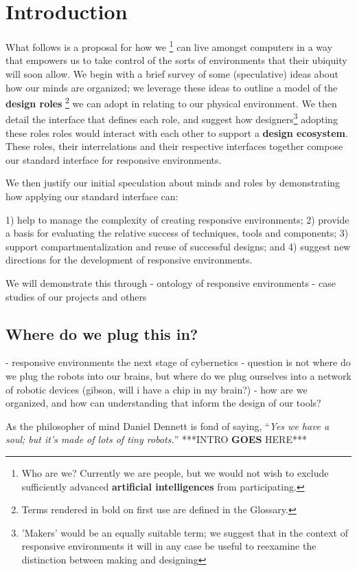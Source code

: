 \section{Introduction}
%
What follows is a proposal for how we%
    \footnote{Who are we? Currently we are people, but we\saveFootnoteCounterStartWithAlph\footnotemark{} would not wish to exclude sufficiently advanced {\bf artificial intelligences} from participating.}%
        \restoreFootnoteCounter{}
can live amongst computers in a way that empowers us to take control of the sorts of environments that their ubiquity will soon allow. 
We begin with a brief survey of some (speculative) ideas about how our minds are organized; we leverage these ideas to outline a model of the {\bf design roles}%
\footnote{Terms rendered in bold on first use are defined in the Glossary.}
we can adopt in relating to our physical environment.
We then detail the interface that defines each role, and suggest how designers\footnote{'Makers' would be an equally suitable term; we suggest that in the context of responsive environments it will in any case be useful to reexamine the distinction between making and designing} adopting these roles roles would interact with each other to support a {\bf design ecosystem}.
These roles, their interrelations and their respective interfaces together compose our standard interface for responsive environments.

We then justify our initial speculation about minds and roles by demonstrating how applying our standard interface can:

1) help to manage the complexity of creating responsive environments;
2) provide a basis for evaluating the relative success of techniques, tools and components;
3) support compartmentalization and reuse of successful designs; and
4) suggest new directions for the development of responsive environments.

We will demonstrate this through
- ontology of responsive environments
- case studies of our projects and others

\subsection{Where do we plug this in?}
%
- responsive environments the next stage of cybernetics
- question is not where do we plug the robots into our brains, but where do we plug ourselves into a network of robotic devices (gibson, will i have a chip in my brain?)
- how are we organized, and how can understanding that inform the design of our tools?

As the philosopher of mind Daniel Dennett is fond of saying, ``\emph{Yes we have a soul; but it's made of lots of tiny robots.}'' \citeyearpar[p. 1]{freedom_evolves}
% 
***INTRO {\bf GOES} HERE*** \citep{society_of_mind}


